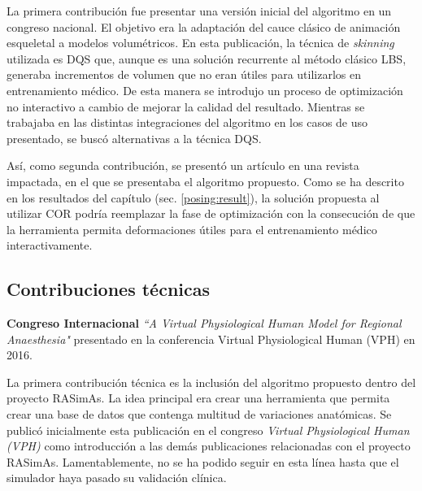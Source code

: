
La primera contribución fue presentar una versión inicial del algoritmo en un congreso nacional. El objetivo era la adaptación del cauce clásico de animación esqueletal a modelos volumétricos. En esta publicación, la técnica de \emph{skinning} utilizada es \ac{DQS} que, aunque es una solución recurrente al método clásico \ac{LBS}, generaba incrementos de volumen que no eran útiles para utilizarlos en entrenamiento médico. De esta manera se introdujo un proceso de optimización no interactivo a cambio de mejorar la calidad del resultado. Mientras se trabajaba en las distintas integraciones del algoritmo en los casos de uso presentado, se buscó alternativas a la técnica \ac{DQS}.

Así, como segunda contribución, se presentó un artículo en una revista impactada, en el que se presentaba el algoritmo propuesto. Como se ha descrito en los resultados del capítulo (sec. \ref{posing:result}), la solución propuesta al utilizar \ac{COR} podría reemplazar la fase de optimización con la consecución de que la herramienta permita deformaciones útiles para el entrenamiento médico interactivamente.






\subsection{Contribuciones técnicas}
\label{conclu:tecnica}

\textbf{ Congreso Internacional }\emph{``A Virtual Physiological Human Model for Regional Anaesthesia"}\cite{VHZKLBSGSD16} presentado en la conferencia Virtual Physiological Human (VPH) en 2016.

La primera contribución técnica es la inclusión del algoritmo propuesto dentro del proyecto \ac{RASimAs}. La idea principal era crear una herramienta que permita crear una base de datos que contenga multitud de variaciones anatómicas.  Se publicó inicialmente esta publicación en el congreso \emph{ Virtual Physiological Human (VPH)} como introducción a las demás publicaciones relacionadas con el proyecto \ac{RASimAs}. Lamentablemente, no se ha podido seguir en esta línea hasta que el simulador haya pasado su validación clínica.

